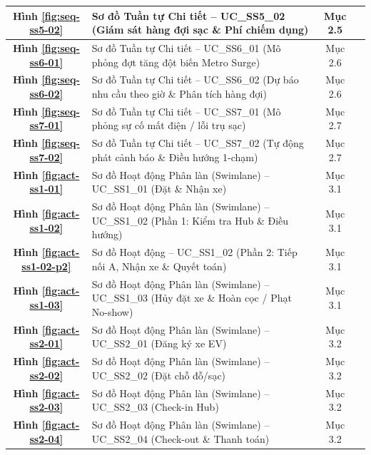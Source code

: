 \documentclass[12pt,a4paper]{article}
\begin{document}
\begin{longtable}{|c|p{8.5cm}|c|c|}
    \hline
    \textbf{Hình \ref{fig:seq-ss5-02}} & Sơ đồ Tuần tự Chi tiết -- UC\_SS5\_02 (Giám sát hàng đợi sạc \& Phí chiếm dụng) & Mục 2.5 & \pageref{fig:seq-ss5-02} \\
    \hline
    \textbf{Hình \ref{fig:seq-ss6-01}} & Sơ đồ Tuần tự Chi tiết -- UC\_SS6\_01 (Mô phỏng đợt tăng đột biến Metro Surge) & Mục 2.6 & \pageref{fig:seq-ss6-01} \\
    \hline
    \textbf{Hình \ref{fig:seq-ss6-02}} & Sơ đồ Tuần tự Chi tiết -- UC\_SS6\_02 (Dự báo nhu cầu theo giờ \& Phân tích hàng đợi) & Mục 2.6 & \pageref{fig:seq-ss6-02} \\
    \hline
    \textbf{Hình \ref{fig:seq-ss7-01}} & Sơ đồ Tuần tự Chi tiết -- UC\_SS7\_01 (Mô phỏng sự cố mất điện / lỗi trụ sạc) & Mục 2.7 & \pageref{fig:seq-ss7-01} \\
    \hline
    \textbf{Hình \ref{fig:seq-ss7-02}} & Sơ đồ Tuần tự Chi tiết -- UC\_SS7\_02 (Tự động phát cảnh báo \& Điều hướng 1-chạm) & Mục 2.7 & \pageref{fig:seq-ss7-02} \\
    \hline
    \textbf{Hình \ref{fig:act-ss1-01}} & Sơ đồ Hoạt động Phân làn (Swimlane) -- UC\_SS1\_01 (Đặt \& Nhận xe) & Mục 3.1 & \pageref{fig:act-ss1-01} \\
    \hline
    \textbf{Hình \ref{fig:act-ss1-02}} & Sơ đồ Hoạt động Phân làn (Swimlane) -- UC\_SS1\_02 (Phần 1: Kiểm tra Hub \& Điều hướng) & Mục 3.1 & \pageref{fig:act-ss1-02} \\
    \hline
    \textbf{Hình \ref{fig:act-ss1-02-p2}} & Sơ đồ Hoạt động -- UC\_SS1\_02 (Phần 2: Tiếp nối A, Nhận xe \& Quyết toán) & Mục 3.1 & \pageref{fig:act-ss1-02-p2} \\
    \hline
    \textbf{Hình \ref{fig:act-ss1-03}} & Sơ đồ Hoạt động Phân làn (Swimlane) -- UC\_SS1\_03 (Hủy đặt xe \& Hoàn cọc / Phạt No-show) & Mục 3.1 & \pageref{fig:act-ss1-03} \\
    \hline
    \textbf{Hình \ref{fig:act-ss2-01}} & Sơ đồ Hoạt động Phân làn (Swimlane) -- UC\_SS2\_01 (Đăng ký xe EV) & Mục 3.2 & \pageref{fig:act-ss2-01} \\
    \hline
    \textbf{Hình \ref{fig:act-ss2-02}} & Sơ đồ Hoạt động Phân làn (Swimlane) -- UC\_SS2\_02 (Đặt chỗ đỗ/sạc) & Mục 3.2 & \pageref{fig:act-ss2-02} \\
    \hline
    \textbf{Hình \ref{fig:act-ss2-03}} & Sơ đồ Hoạt động Phân làn (Swimlane) -- UC\_SS2\_03 (Check-in Hub) & Mục 3.2 & \pageref{fig:act-ss2-03} \\
    \hline
    \textbf{Hình \ref{fig:act-ss2-04}} & Sơ đồ Hoạt động Phân làn (Swimlane) -- UC\_SS2\_04 (Check-out \& Thanh toán) & Mục 3.2 & \pageref{fig:act-ss2-04} \\

\end{longtable}
\end{document}
